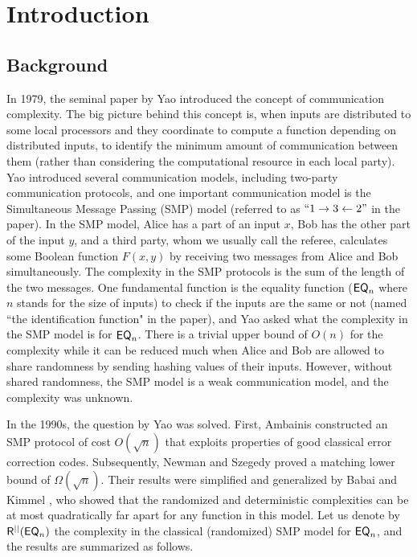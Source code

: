 \section{Introduction}

\subsection{Background}

In 1979, the seminal paper by Yao \cite{Yao79} introduced the concept of communication complexity. The big picture behind this concept is, when inputs are distributed to some local processors and they coordinate to compute a function depending on distributed inputs, to identify the minimum amount of communication between them (rather than considering the computational resource in each local party). Yao introduced several communication models, including two-party communication protocols, and one important communication model is the Simultaneous Message Passing (SMP) model (referred to as $``1 \rightarrow 3 \leftarrow 2"$ in the paper). In the SMP model, Alice has a part of an input $x$, Bob has the other part of the input $y$, and a third party, whom we usually call the referee, calculates some Boolean function $F(x,y)$ by receiving two messages from Alice and Bob simultaneously. The complexity in the SMP protocols is the sum of the length of the two messages. One fundamental function is the equality function ($\mathsf{EQ}_n$ where $n$ stands for the size of inputs) to check if the inputs are the same or not (named ``the identification function" in the paper), and Yao asked what the complexity in the SMP model is for $\mathsf{EQ}_n$. There is a trivial upper bound of $O(n)$ for the complexity while it can be reduced much when Alice and Bob are allowed to share randomness by sending hashing values of their inputs. 
However, without shared randomness, the SMP model is a weak communication model, and the complexity was unknown.

In the 1990s, the question by Yao was solved. First, Ambainis \cite{Amb96} constructed an SMP protocol of cost $O(\sqrt{n})$ that exploits properties of good classical error correction codes. Subsequently, Newman and Szegedy \cite{NS96} proved a matching lower bound of $\Omega(\sqrt{n})$. Their results were simplified and generalized by Babai and Kimmel \cite{BK97}, who showed that the randomized and
deterministic complexities can be at most quadratically far apart for any function in this model. Let us denote by $\mathsf{R}^{||}(\mathsf{EQ}_n)$ the complexity in the classical (randomized) SMP model for $\mathsf{EQ}_n$, and the results are summarized as follows.

